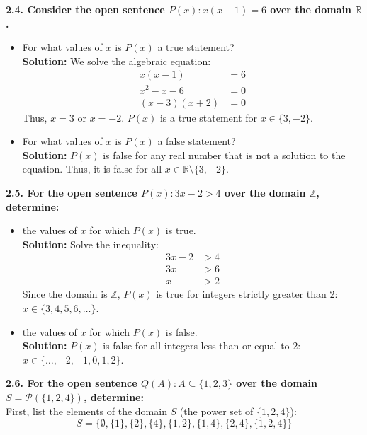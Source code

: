 \documentclass[11pt]{article}
\begin{document}
\vspace{0.5cm}
\textbf{2.4. Consider the open sentence $P(x) : x(x - 1) = 6$ over the domain $\mathbb{R}$.}
\begin{itemize}
    \item[(a)] For what values of $x$ is $P(x)$ a true statement? \\
    \textbf{Solution:} We solve the algebraic equation:
    \begin{align*}
        x(x - 1) &= 6 \\
        x^2 - x - 6 &= 0 \\
        (x - 3)(x + 2) &= 0
    \end{align*}
    Thus, $x = 3$ or $x = -2$. $P(x)$ is a true statement for \textbf{$x \in \{3, -2\}$}.
    
    \item[(b)] For what values of $x$ is $P(x)$ a false statement? \\
    \textbf{Solution:} $P(x)$ is false for any real number that is not a solution to the equation. Thus, it is false for all \textbf{$x \in \mathbb{R} \setminus \{3, -2\}$}.
\end{itemize}

\vspace{0.5cm}
\textbf{2.5. For the open sentence $P(x): 3x - 2 > 4$ over the domain $\mathbb{Z}$, determine:}
\begin{itemize}
    \item[(a)] the values of $x$ for which $P(x)$ is true. \\
    \textbf{Solution:} Solve the inequality:
    \begin{align*}
        3x - 2 &> 4 \\
        3x &> 6 \\
        x &> 2
    \end{align*}
    Since the domain is $\mathbb{Z}$, $P(x)$ is true for integers strictly greater than 2: \textbf{$x \in \{3, 4, 5, 6, \dots\}$}.
    
    \item[(b)] the values of $x$ for which $P(x)$ is false. \\
    \textbf{Solution:} $P(x)$ is false for all integers less than or equal to 2: \textbf{$x \in \{\dots, -2, -1, 0, 1, 2\}$}.
\end{itemize}

\vspace{0.5cm}
\textbf{2.6. For the open sentence $Q(A): A \subseteq \{1, 2, 3\}$ over the domain $S = \mathcal{P}(\{1, 2, 4\})$, determine:} \\
First, list the elements of the domain $S$ (the power set of $\{1, 2, 4\}$): 
\[ S = \{\emptyset, \{1\}, \{2\}, \{4\}, \{1, 2\}, \{1, 4\}, \{2, 4\}, \{1, 2, 4\}\} \]
\end{document}
